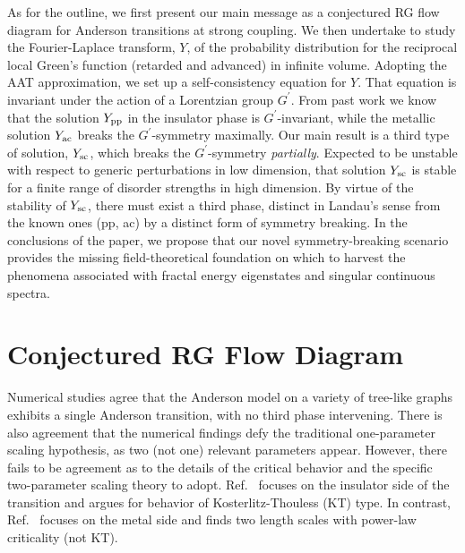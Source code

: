 \documentclass[aps,prl,twocolumn,letterpaper,superscriptaddress]{revtex4-2}
\begin{document}
As for the outline, we first present our main message as a conjectured RG flow diagram for Anderson transitions at strong coupling.
We then undertake to study the Fourier-Laplace transform, $Y$, of the probability distribution for the reciprocal local Green's function (retarded and advanced) in infinite volume. Adopting the AAT approximation, we set up a self-consistency equation for $Y$. That equation is invariant under the action of a Lorentzian group $G^\prime$. From past work we know that the solution $Y_{\rm pp}$ in the insulator phase is $G^\prime$-invariant, while the metallic solution $Y_{\rm ac}$ breaks the $G^\prime$-symmetry maximally. Our main result is a third type of solution, $Y_{\rm sc}$, which breaks the $G^\prime$-symmetry \emph{partially}. Expected to be unstable with respect to generic perturbations in low dimension, that solution  $Y_{\rm sc}$ is stable for a finite range of disorder strengths in high dimension. By virtue of the stability of $Y_{\rm sc}$, there must exist a third phase, distinct in Landau's sense from the known ones (pp, ac) by a distinct form of symmetry breaking. In the conclusions of the paper, we propose that our novel symmetry-breaking scenario provides the missing field-theoretical foundation on which to harvest the phenomena associated with fractal energy eigenstates and singular continuous spectra.

\section{Conjectured RG Flow Diagram}
Numerical studies \cite{BHT2022, Lemarie2022, SLS2022} agree that the Anderson model on a variety of tree-like graphs exhibits a single Anderson transition, with no third phase intervening. There is also agreement that the numerical findings defy the traditional one-parameter scaling hypothesis, as two (not one) relevant parameters appear. However, there fails to be agreement as to the details of the critical behavior and the specific two-parameter scaling theory to adopt. Ref.\ \cite{Lemarie2022} focuses on the insulator side of the transition and argues for behavior of Kosterlitz-Thouless (KT) type. In contrast, Ref.\ \cite{SLS2022} focuses on the metal side and finds two length scales with power-law criticality (not KT).
\end{document}
